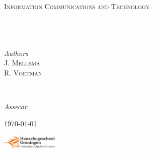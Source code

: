 \begin{titlepage}
	\center


	\textsc{\LARGE \university}\\[1.5cm]

	\textsc{\Large \course}\\[0.5cm]

	\textsc{\large Information Communications and Technology}\\[0.5cm]


	\HRule\\[0.4cm]

	{\huge\bfseries \report}\\[0.4cm]

	\HRule\\[1.5cm]


	\begin{minipage}{0.4\textwidth}
		\begin{flushleft}
			\large
			\textit{Authors}\\
			J. \textsc{Mellema}\\
			R. \textsc{Voetman}
		\end{flushleft}
	\end{minipage}
    ~
	\begin{minipage}{0.4\textwidth}
		\begin{flushright}
			\large
			\textit{Assecor}\\
			\assecorInitials \textsc{\assecorSurname}
		\end{flushright}
	\end{minipage}


	\vfill\vfill\vfill %

	{\large\today}


	\vfill\vfill
	\includegraphics[width=0.2\textwidth]{logo.png}\\[1cm]

\end{titlepage}